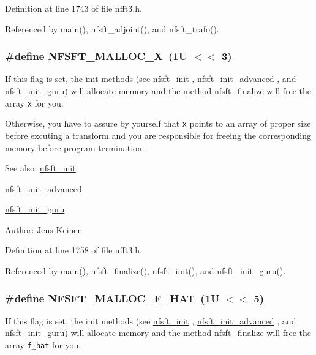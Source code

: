 Definition at line 1743 of file nfft3.h.

Referenced by main(), nfsft\_\-adjoint(), and nfsft\_\-trafo().\hypertarget{group__nfsft_ga28}{
\subsubsection[NFSFT\_\-MALLOC\_\-X]{\setlength{\rightskip}{0pt plus 5cm}\#define NFSFT\_\-MALLOC\_\-X~(1U $<$$<$ 3)}}
\label{group__nfsft_ga28}


If this flag is set, the init methods (see \hyperlink{group__nfsft_ga1}{nfsft\_\-init} , \hyperlink{group__nfsft_ga2}{nfsft\_\-init\_\-advanced} , and \hyperlink{group__nfsft_ga3}{nfsft\_\-init\_\-guru}) will allocate memory and the method \hyperlink{group__nfsft_ga10}{nfsft\_\-finalize} will free the array {\tt x} for you. 

Otherwise, you have to assure by yourself that {\tt x} points to an array of proper size before excuting a transform and you are responsible for freeing the corresponding memory before program termination.

\begin{Desc}
\item[See also:]\hyperlink{group__nfsft_ga1}{nfsft\_\-init} 

\hyperlink{group__nfsft_ga2}{nfsft\_\-init\_\-advanced} 

\hyperlink{group__nfsft_ga3}{nfsft\_\-init\_\-guru} \end{Desc}
\begin{Desc}
\item[Author:]Jens Keiner \end{Desc}


Definition at line 1758 of file nfft3.h.

Referenced by main(), nfsft\_\-finalize(), nfsft\_\-init(), and nfsft\_\-init\_\-guru().\hypertarget{group__nfsft_ga29}{
\subsubsection[NFSFT\_\-MALLOC\_\-F\_\-HAT]{\setlength{\rightskip}{0pt plus 5cm}\#define NFSFT\_\-MALLOC\_\-F\_\-HAT~(1U $<$$<$ 5)}}
\label{group__nfsft_ga29}


If this flag is set, the init methods (see \hyperlink{group__nfsft_ga1}{nfsft\_\-init} , \hyperlink{group__nfsft_ga2}{nfsft\_\-init\_\-advanced} , and \hyperlink{group__nfsft_ga3}{nfsft\_\-init\_\-guru}) will allocate memory and the method \hyperlink{group__nfsft_ga10}{nfsft\_\-finalize} will free the array {\tt f\_\-hat} for you. 

